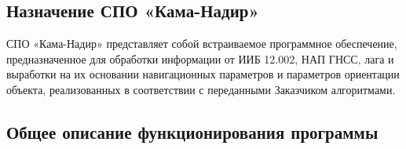  \label{purpose}
\subsection{Назначение СПО «Кама-Надир»}
СПО «Кама-Надир» представляет собой встраиваемое программное обеспечение, предназначенное для обработки информации от ИИБ 12.002, НАП ГНСС, 
лага и выработки на их основании навигационных параметров и параметров ориентации объекта, 
реализованных в соответствии с переданными Заказчиком алгоритмами.
\subsection{Общее описание функционирования программы}